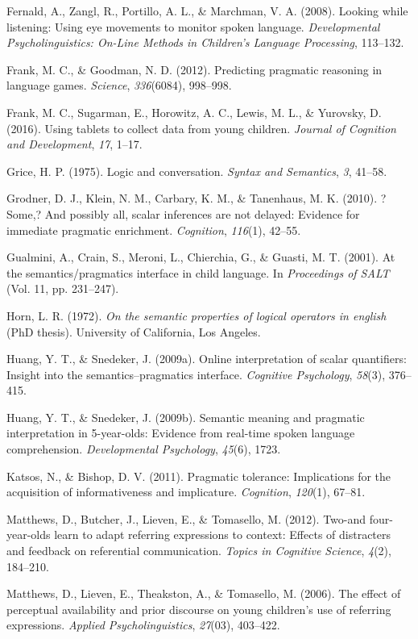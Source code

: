 \documentclass[a4paper,man,apacite,floatsintext]{apa6}
\begin{document}
Fernald, A., Zangl, R., Portillo, A. L., \& Marchman, V. A. (2008).
Looking while listening: Using eye movements to monitor spoken language.
\emph{Developmental Psycholinguistics: On-Line Methods in Children's
Language Processing}, 113--132.

Frank, M. C., \& Goodman, N. D. (2012). Predicting pragmatic reasoning
in language games. \emph{Science}, \emph{336}(6084), 998--998.

Frank, M. C., Sugarman, E., Horowitz, A. C., Lewis, M. L., \& Yurovsky,
D. (2016). Using tablets to collect data from young children.
\emph{Journal of Cognition and Development}, \emph{17}, 1--17.

Grice, H. P. (1975). Logic and conversation. \emph{Syntax and
Semantics}, \emph{3}, 41--58.

Grodner, D. J., Klein, N. M., Carbary, K. M., \& Tanenhaus, M. K.
(2010). ?Some,? And possibly all, scalar inferences are not delayed:
Evidence for immediate pragmatic enrichment. \emph{Cognition},
\emph{116}(1), 42--55.

Gualmini, A., Crain, S., Meroni, L., Chierchia, G., \& Guasti, M. T.
(2001). At the semantics/pragmatics interface in child language. In
\emph{Proceedings of SALT} (Vol. 11, pp. 231--247).

Horn, L. R. (1972). \emph{On the semantic properties of logical
operators in english} (PhD thesis). University of California, Los
Angeles.

Huang, Y. T., \& Snedeker, J. (2009a). Online interpretation of scalar
quantifiers: Insight into the semantics--pragmatics interface.
\emph{Cognitive Psychology}, \emph{58}(3), 376--415.

Huang, Y. T., \& Snedeker, J. (2009b). Semantic meaning and pragmatic
interpretation in 5-year-olds: Evidence from real-time spoken language
comprehension. \emph{Developmental Psychology}, \emph{45}(6), 1723.

Katsos, N., \& Bishop, D. V. (2011). Pragmatic tolerance: Implications
for the acquisition of informativeness and implicature.
\emph{Cognition}, \emph{120}(1), 67--81.

Matthews, D., Butcher, J., Lieven, E., \& Tomasello, M. (2012). Two-and
four-year-olds learn to adapt referring expressions to context: Effects
of distracters and feedback on referential communication. \emph{Topics
in Cognitive Science}, \emph{4}(2), 184--210.

Matthews, D., Lieven, E., Theakston, A., \& Tomasello, M. (2006). The
effect of perceptual availability and prior discourse on young
children's use of referring expressions. \emph{Applied
Psycholinguistics}, \emph{27}(03), 403--422.
\end{document}
